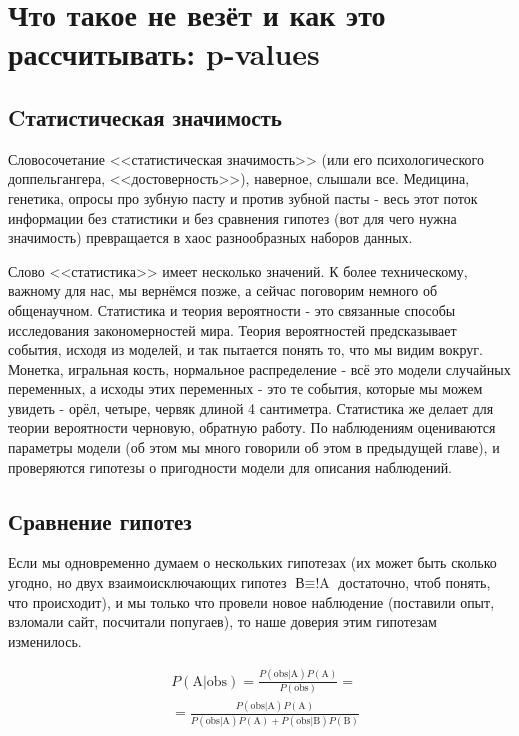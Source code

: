 \documentclass{book}
\begin{document}

\chapter[Что такое не везёт: p-values]{Что такое не везёт и как это рассчитывать: p-values}

\section*{Cтатистическая значимость}

Словосочетание <<статистическая значимость>> (или его психологического доппельгангера, <<достоверность>>), наверное, слышали все. Медицина, генетика, опросы про зубную пасту и против зубной пасты - весь этот поток информации без статистики и без сравнения гипотез (вот для чего нужна значимость) превращается в хаос разнообразных наборов данных.

Слово <<статистика>> имеет несколько значений. К более техническому, важному для нас, мы вернёмся позже, а сейчас поговорим немного об общенаучном. Статистика и теория вероятности - это связанные способы исследования закономерностей мира. Теория вероятностей предсказывает события, исходя из моделей, и так пытается понять то, что мы видим вокруг. Монетка, игральная кость, нормальное распределение - всё это модели случайных переменных, а исходы этих переменных - это те события, которые мы можем увидеть - орёл, четыре, червяк длиной 4 сантиметра. Статистика же делает для теории вероятности черновую, обратную работу. По наблюдениям оцениваются параметры модели (об этом мы много говорили об этом в предыдущей главе), и проверяются гипотезы о пригодности модели для описания наблюдений. 

\section*{Сравнение гипотез}

Если мы одновременно думаем о нескольких гипотезах (их может быть сколько угодно, но двух взаимоисключающих гипотез $\text{В} \equiv \text{!A}$ достаточно, чтоб понять, что происходит), и мы только что провели новое наблюдение  (поставили опыт, взломали сайт, посчитали попугаев), то наше доверия этим гипотезам изменилось.  

\begin{align}\label{hyp_compare_bayes_A}
   &P\left(\text{A|obs}\right)=
   \frac{P\left(\text{obs|A}\right) P\left(\text{A}\right)}{P\left(\text{obs}\right)} = \nonumber \\
   &=\frac{P\left(\text{obs|A}\right) P\left(\text{A}\right)}{P\left(\text{obs|A}\right) P\left(\text{A}\right)+P\left(\text{obs|B}\right) P\left(\text{B}\right)} 
\end{align}
\end{document}
